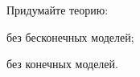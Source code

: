 Придумайте теорию:
\begin{enumcyr}
    \item без бесконечных моделей;
    \item без конечных моделей.
\end{enumcyr}